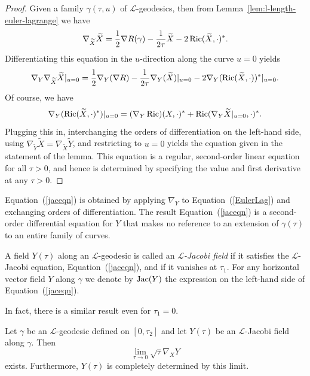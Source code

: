 \begin{proof}
\sketch
{}
Given a family $\gamma(\tau,u)$ of ${\mathcal L}$-geodesics, then
from Lemma~\ref{lem:l-length-euler-lagrange} we have
$$ \nabla_{\widetilde X}\widetilde X = \frac{1}{2}\nabla R(\gamma)
-\frac{1}{2\tau}\widetilde X - 2\operatorname{Ric}(\widetilde X,\cdot)^*.$$
Differentiating this equation in the $u$-direction along the curve
$u=0$ yields
$$\nabla_Y
\nabla_{\widetilde X}\widetilde X|_{u=0}=\frac{1}{2}\nabla_Y(\nabla
R)-\frac{1}{2\tau}\nabla_Y(\widetilde X)|_{u=0} -2\nabla_Y(\operatorname{Ric}(\widetilde X,\cdot))^*|_{u=0}.$$ Of course, we have
$$\nabla_Y(\operatorname{Ric}(\widetilde X,\cdot)^*)|_{u=0}=(\nabla_Y\operatorname{Ric})(X,\cdot)^*
+\operatorname{Ric}(\nabla_Y\widetilde X|_{u=0},\cdot)^*.$$ Plugging this in,
interchanging the orders of differentiation on the left-hand side, using
$\nabla_{\widetilde Y}\widetilde X=\nabla_{\widetilde X}\widetilde Y$, and
restricting to $u=0$ yields the equation given in the statement of the lemma.
This equation is a regular, second-order linear equation  for all $\tau>0$, and
hence is determined by specifying the value and first derivative at any
$\tau>0$.
\end{proof}

Equation~(\ref{jaceqn}) is obtained by applying $\nabla_Y$ to
Equation~(\ref{EulerLag}) and exchanging orders of differentiation.
The result Equation~(\ref{jaceqn}) is a second-order differential
equation for $Y$ that makes no reference to an extension of
$\gamma(\tau)$ to an entire family of curves.



\begin{definition}\label{def:l-jacobi-field}

A field $Y(\tau)$ along an ${\mathcal L}$-geodesic is
called an {\em ${\mathcal L}$-Jacobi field} if it satisfies the ${\mathcal L}$-Jacobi
equation, Equation~(\ref{jaceqn}), and if it vanishes at $\tau_1$.
For any horizontal vector field $Y$ along $\gamma$ we denote by
$\operatorname{Jac}(Y)$ the expression on the left-hand
side of Equation~(\ref{jaceqn}).
\end{definition}

In fact, there is a similar result even for $\tau_1=0$.

\begin{lemma}\label{lem:l-jacobi-field-initial-limit}

Let $\gamma$ be an ${\mathcal L}$-geodesic defined on $[0,\tau_2]$
and let $Y(\tau)$ be an ${\mathcal L}$-Jacobi field along $\gamma$.
Then
$$\lim_{\tau\rightarrow 0}\sqrt{\tau}\nabla_XY$$
exists. Furthermore, $Y(\tau)$ is completely determined by this
limit.
\end{lemma}


